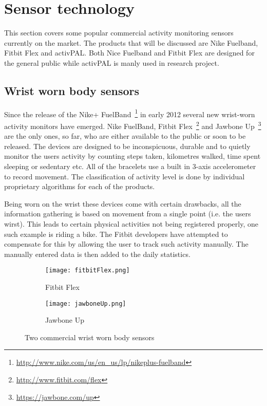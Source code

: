 \section{Sensor technology}
This section covers some popular commercial activity monitoring sensors currently on the market. The products that will be discussed are Nike Fuelband, Fitbit Flex and activPAL. Both Nice Fuelband and Fitbit Flex are designed for the general public while activPAL is manly used in research project.

\subsection{Wrist worn body sensors}
Since the release of the Nike+ FuelBand~\footnote{\url{http://www.nike.com/us/en_us/lp/nikeplus-fuelband}} in early 2012 several new wrist-worn activity monitors have emerged. Nike FuelBand, Fitbit Flex~\footnote{\url{http://www.fitbit.com/flex}} and Jawbone Up~\footnote{\url{https://jawbone.com/up}} are the only ones, so far, who are either available to the public or soon to be released. The devices are designed to be inconspicuous, durable and to quietly monitor the users activity by counting steps taken, kilometres walked, time spent sleeping or sedentary etc. All of the bracelets use a built in 3-axis accelerometer to record movement. The classification of activity level is done by individual proprietary algorithms for each of the products. 

Being worn on the wrist these devices come with certain drawbacks, all the information gathering is based on movement from a single point (i.e. the users wirst). This leads to certain physical activities not being registered properly, one such example is riding a bike. The Fitbit developers have attempted to compensate for this by allowing the user to track such activity manually. The manually entered data is then added to the daily statistics. 

\begin{figure}[h!]
  \centering
  \begin{subfigure}[b]{0.45\textwidth}
    \centering
    \texttt{[image: fitbitFlex.png]}
    \caption{Fitbit Flex}
    \label{fig:fitbitFlex}
  \end{subfigure}
  \begin{subfigure}[b]{0.45\textwidth}
    \centering
    \texttt{[image: jawboneUp.png]}
    \caption{Jawbone Up}
    \label{fig:jawboneUp}
  \end{subfigure}
  \caption{Two commercial wrist worn body sensors}
\end{figure}

